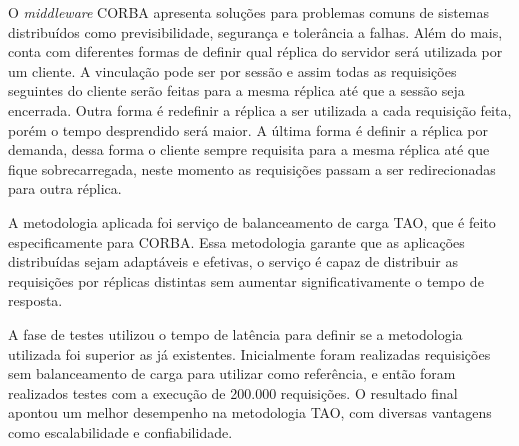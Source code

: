 	O \textit{middleware} CORBA apresenta soluções para problemas comuns de sistemas distribuídos como previsibilidade, segurança e tolerância a falhas. Além do mais, conta com diferentes formas de definir qual réplica do servidor será utilizada por um cliente. A vinculação pode ser por sessão e assim todas as requisições seguintes do cliente serão feitas para a mesma réplica até que a sessão seja encerrada. Outra forma é redefinir a réplica a ser utilizada a cada requisição feita, porém o tempo desprendido será maior. A última forma é definir a réplica por demanda, dessa forma o cliente sempre requisita para a mesma réplica até que fique sobrecarregada, neste momento as requisições passam a ser redirecionadas para outra réplica.
	
	A metodologia aplicada foi serviço de balanceamento de carga TAO, que é feito especificamente para CORBA. Essa metodologia garante que as aplicações distribuídas sejam adaptáveis e efetivas, o serviço é capaz de distribuir as requisições por réplicas distintas sem aumentar significativamente o tempo de resposta.
	
	A fase de testes utilizou o tempo de latência para definir se a metodologia utilizada foi superior as já existentes. Inicialmente foram realizadas requisições sem balanceamento de carga para utilizar como referência, e então foram realizados testes com a execução de 200.000 requisições. O resultado final apontou um melhor desempenho na metodologia TAO, com diversas vantagens como escalabilidade e confiabilidade.